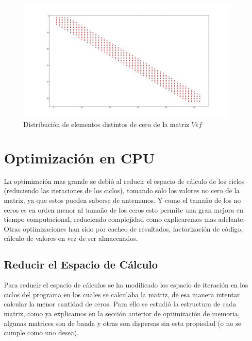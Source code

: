 \documentclass[a4paper,openright,12pt, oneside]{book}
\begin{document}
\begin{figure}[!htbp]
  \begin{center}
    \leavevmode

    \includegraphics[scale=0.3]{ke,s,v0.png}

    \caption{Distribuci\'on de elementos distintos de cero de la matriz $Vef$}
    \label{img:matstyle}
  \end{center}
\end{figure}
    


\section{Optimizaci\'on en CPU}
La optimizaci\'on mas grande se debi\'o al reducir el espacio de c\'alculo de los ciclos (reduciendo las iteraciones de los ciclos), tomando solo los valores no cero de la matriz, ya que estos pueden saberse de antemanos. 
Y como el tama\~no de los no ceros es en orden menor al tama\~no de los ceros esto permite una gran mejora en tiempo computacional, reduciendo complejidad como explicaremos mas adelante.
Otras optimizaciones han sido por cacheo de resultados, factorizaci\'on de c\'odigo, c\'alculo de valores en vez de ser almacenados.

\subsection{Reducir el Espacio de C\'alculo}

Para reducir el espacio de c\'alculos se ha modificado los espacio de iteraci\'on en los ciclos del programa en los cuales se calculaba la matriz, de esa manera intentar calcular la menor cantidad de ceros. Para ello se estudi\'o la estructura de cada matriz, como ya explicamos en la secci\'on anterior de optimizaci\'on de memoria, algunas matrices son de banda y otras son dispersas sin esta propiedad (o no se cumple como uno desea).
\end{document}
